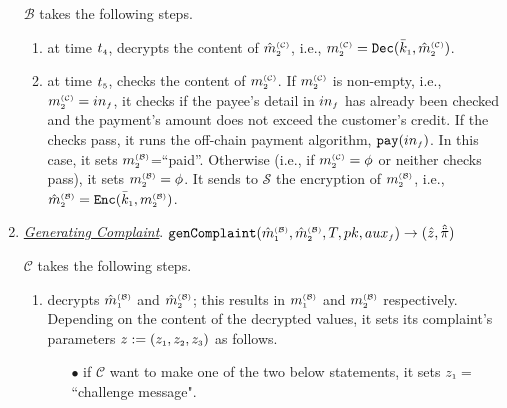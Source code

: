 \begin{enumerate}
$\mathcal{B}$ takes the following steps. 
\begin{enumerate}
%
 \item at time $t_{\scriptscriptstyle 4}$, decrypts  the content of $\hat m_{\scriptscriptstyle 2}^{\scriptscriptstyle(\mathcal C)}$, i.e.,  $ m_{\scriptscriptstyle 2}^{\scriptscriptstyle(\mathcal{C})}= \mathtt{Dec}(\bar k_{\scriptscriptstyle 1}, \hat m_{\scriptscriptstyle 2}^{\scriptscriptstyle(\mathcal C)})$.
 \item at time $t_{\scriptscriptstyle 5}$, checks the content of $m_{\scriptscriptstyle 2}^{\scriptscriptstyle(\mathcal C)}$. If $m_{\scriptscriptstyle 2}^{\scriptscriptstyle(\mathcal C)}$ is non-empty, i.e., $m_{\scriptscriptstyle 2}^{\scriptscriptstyle(\mathcal C)}=in_{\scriptscriptstyle f}$, it checks if the payee's detail in $in_{\scriptscriptstyle f}$ has already been checked and the payment's amount does not exceed the customer's credit. If the checks pass, it  runs the off-chain payment algorithm, $\mathtt{pay}(in_{\scriptscriptstyle f})$.  In this case, it sets $m_{\scriptscriptstyle 2}^{\scriptscriptstyle(\mathcal B)}$=``paid''. Otherwise (i.e., if $m_{\scriptscriptstyle 2}^{\scriptscriptstyle(\mathcal C)}=\phi$ or neither checks pass), it sets $m_{\scriptscriptstyle 2}^{\scriptscriptstyle(\mathcal B)}=\phi$. It sends  to $\mathcal{S}$ the encryption of  $m_{\scriptscriptstyle 2}^{\scriptscriptstyle(\mathcal B)}$, i.e., $\hat m_{\scriptscriptstyle 2}^{\scriptscriptstyle(\mathcal{B})}= \mathtt{Enc}(\bar k_{\scriptscriptstyle 1}, m_{\scriptscriptstyle 2}^{\scriptscriptstyle(\mathcal B)})$.  %
\end{enumerate}
%
\vspace{2mm}
\item  \underline{\textit{Generating Complaint}}. $\mathtt{genComplaint}(\hat m^{\scriptscriptstyle\mathcal{(B)}}_{\scriptscriptstyle 1}, \hat m^{\scriptscriptstyle\mathcal{(B)}}_{\scriptscriptstyle2}, T, pk, {aux}_{\scriptscriptstyle f})\rightarrow  (\hat z, \hat{\ddot \pi})$

$\mathcal{C}$ takes the following steps. 
\begin{enumerate}
%
\item\label{DR::C-sends-complaint} decrypts $ \hat m^{\scriptscriptstyle\mathcal{(B)}}_{\scriptscriptstyle 1}$ and $\hat m^{\scriptscriptstyle\mathcal{(B)}}_{\scriptscriptstyle2}$; this results in $  m^{\scriptscriptstyle\mathcal{(B)}}_{\scriptscriptstyle 1}$ and $ m^{\scriptscriptstyle\mathcal{(B)}}_{\scriptscriptstyle2}$ respectively. Depending on the content of  the decrypted values, it sets its complaint's parameters $z:=(z_{\scriptscriptstyle 1}, z_{\scriptscriptstyle 2}, z_{\scriptscriptstyle 3})$ as follows.  %

\begin{itemize}
%
%
 \item  [$\bullet$] if $\mathcal{C}$ want to make one of the two below statements, it sets  $z_{\scriptscriptstyle 1}=$``challenge message".
 

\end{itemize}
\end{enumerate}
\end{enumerate}
